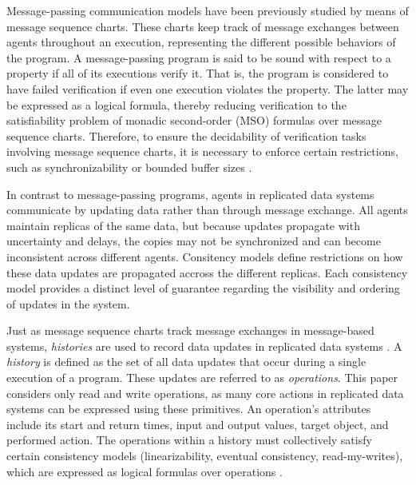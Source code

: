\documentclass[12pt]{article}
\begin{document}
Message-passing communication models have been previously studied  by means of message sequence charts. These charts keep track of message exchanges between agents throughout an execution, representing the different possible behaviors of the program. A message-passing program is said to be sound with respect to a property if all of its executions verify it. That is, the program is considered to have failed verification if even one execution violates the property. The latter may be expressed as a logical formula, thereby reducing verification to the satisfiability problem of monadic second-order (MSO) formulas over message sequence charts.
Therefore, to ensure the decidability of verification tasks involving message sequence charts, it is necessary to enforce certain restrictions, such as synchronizability or bounded buffer sizes .

In contrast to message-passing programs, agents in replicated data systems communicate by updating data rather than through message exchange. All agents maintain replicas of the same data, but because updates propagate with uncertainty and delays, the copies may not be synchronized and can become inconsistent across different agents. Consitency models define restrictions on how these data updates are propagated accross the different replicas. Each consistency model provides a distinct level of guarantee regarding the visibility and ordering of updates in the system. 

Just as message sequence charts track message exchanges in message-based systems, \textsl{histories} are used to record data updates in replicated data systems . A \textsl{history} is defined as the set of all data updates that occur during a single execution of a program. These updates are referred to as \textsl{operations}. This paper considers only read and write operations, as many core actions in replicated data systems can be expressed using these primitives.
An operation’s attributes include its start and return times, input and output values, target object, and performed action. The operations within a history must collectively satisfy certain consistency models (linearizability, eventual consistency, read-my-writes), which are expressed as logical formulas over operations .
\end{document}
